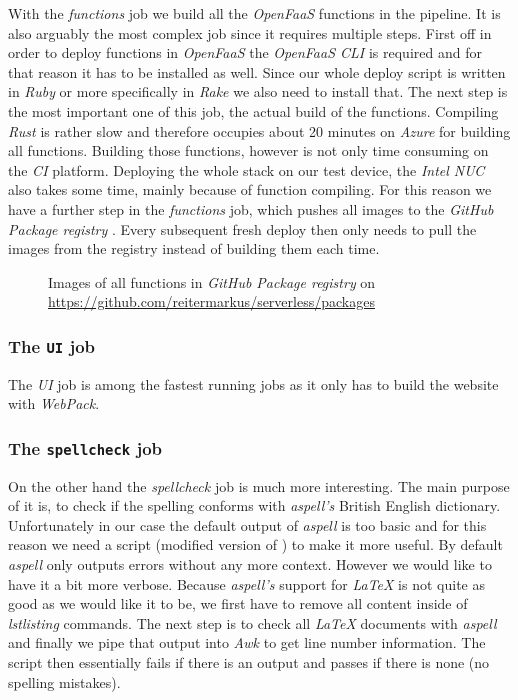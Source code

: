 With the \textit{functions} job we build all the \textit{OpenFaaS} functions in the pipeline. It is
also arguably the most complex job since it requires multiple steps. First off in order to deploy
functions in \textit{OpenFaaS} the \textit{OpenFaaS CLI} \cite{faas-cli} is required and for that
reason it has to be installed as well. Since our whole deploy script is written in \textit{Ruby} or
more specifically in \textit{Rake} we also need to install that. The next step is the most important
one of this job, the actual build of the functions. Compiling \textit{Rust} is rather slow and
therefore occupies about 20 minutes on \textit{Azure} for building all functions. Building those
functions, however is not only time consuming on the \textit{CI} platform. Deploying the whole stack
on our test device, the \textit{Intel NUC} also takes some time, mainly because of function
compiling. For this reason we have a further step in the \textit{functions} job, which pushes all
images to the \textit{GitHub Package registry} \cite{github-registry}. Every subsequent fresh deploy
then only needs to pull the images from the registry instead of building them each time.

\begin{figure}[H]
  \centering
  \caption{Images of all functions in \textit{GitHub Package registry} on \url{https://github.com/reitermarkus/serverless/packages}}
\end{figure}

\subsubsection{The \texttt{UI} job}

The \textit{UI} job is among the fastest running jobs as it only has to build the website with
\textit{WebPack}.

\subsubsection{The \texttt{spellcheck} job}

On the other hand the \textit{spellcheck} job is much more interesting. The main purpose of it is,
to check if the spelling conforms with \textit{aspell's} British English dictionary. Unfortunately
in our case the default output of \textit{aspell} is too basic and for this reason we need a script
(modified version of \cite{aspell-awk}) to make it more useful. By default \textit{aspell} only
outputs errors without any more context. However we would like to have it a bit more verbose.
Because \textit{aspell's} support for \textit{LaTeX} is not quite as good as we would like it to be,
we first have to remove all content inside of \textit{lstlisting} commands. The next step is to
check all \textit{LaTeX} documents with \textit{aspell} and finally we pipe that output into
\textit{Awk} to get line number information. The script then essentially fails if there is an output
and passes if there is none (no spelling mistakes).

